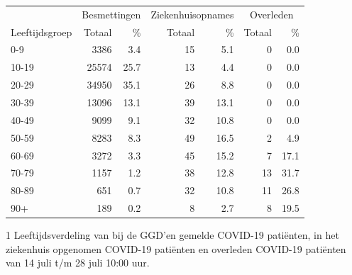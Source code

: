 \documentclass[
  english,
  man,floatsintext]{apa6}
\begin{document}
\begin{table}
\centering\begingroup\fontsize{11}{13}\selectfont

\begin{threeparttable}
\begin{tabular}{lrrrrrr}
\toprule
\multicolumn{1}{c}{ } & \multicolumn{2}{c}{Besmettingen} & \multicolumn{2}{c}{Ziekenhuisopnames} & \multicolumn{2}{c}{Overleden} \\
\cmidrule(l{3pt}r{3pt}){2-3} \cmidrule(l{3pt}r{3pt}){4-5} \cmidrule(l{3pt}r{3pt}){6-7}
Leeftijdsgroep & Totaal & \% & Totaal & \% & Totaal & \%\\
\midrule
0-9 & 3386 & 3.4 & 15 & 5.1 & 0 & 0.0\\
10-19 & 25574 & 25.7 & 13 & 4.4 & 0 & 0.0\\
20-29 & 34950 & 35.1 & 26 & 8.8 & 0 & 0.0\\
30-39 & 13096 & 13.1 & 39 & 13.1 & 0 & 0.0\\
40-49 & 9099 & 9.1 & 32 & 10.8 & 0 & 0.0\\
50-59 & 8283 & 8.3 & 49 & 16.5 & 2 & 4.9\\
60-69 & 3272 & 3.3 & 45 & 15.2 & 7 & 17.1\\
70-79 & 1157 & 1.2 & 38 & 12.8 & 13 & 31.7\\
80-89 & 651 & 0.7 & 32 & 10.8 & 11 & 26.8\\
90+ & 189 & 0.2 & 8 & 2.7 & 8 & 19.5\\
\bottomrule
\end{tabular}
\begin{tablenotes}
\item[1] Leeftijdsverdeling van bij de GGD’en gemelde COVID-19 patiënten, in het ziekenhuis opgenomen COVID-19 patiënten en overleden COVID-19 patiënten van 14 juli t/m 28 juli 10:00 uur.
\end{tablenotes}
\end{threeparttable}
\endgroup{}
\end{table}

\newpage
\end{document}
